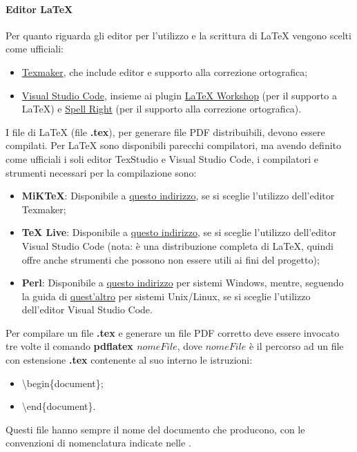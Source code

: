 \paragraph*{Editor \LaTeX}
Per quanto riguarda gli editor per l'utilizzo e la scrittura di \LaTeX{} vengono scelti come ufficiali:
\begin{itemize}
	\item \href{https://www.xm1math.net/texmaker/}{Texmaker}, che include editor e supporto alla correzione ortografica;
	\item \href{https://code.visualstudio.com/}{Visual Studio Code}, insieme ai plugin \href{https://github.com/James-Yu/LaTeX-Workshop}{LaTeX Workshop} (per il supporto a \LaTeX) e \href{https://github.com/bartosz-antosik/vscode-spellright}{Spell Right} (per il supporto alla correzione ortografica).
\end{itemize}
I file di \LaTeX{} (file \textbf{.tex}), per generare file PDF distribuibili, devono essere compilati.
Per \LaTeX{} sono disponibili parecchi compilatori, ma avendo definito come ufficiali i soli editor TexStudio e Visual Studio Code,
i compilatori e strumenti necessari per la compilazione sono:
\begin{itemize}
    \item \textbf{MiKTeX}: Disponibile a \href{https://miktex.org/}{questo indirizzo}, se si sceglie l'utilizzo dell'editor Texmaker;
    \item \textbf{TeX Live}: Disponibile a \href{https://www.tug.org/texlive/}{questo indirizzo}, se si sceglie l'utilizzo dell'editor Visual Studio Code (nota: è una distribuzione completa di \LaTeX, quindi offre anche strumenti che possono non essere utili ai fini del progetto);
    \item \textbf{Perl}: Disponibile a \href{http://strawberryperl.com/}{questo indirizzo} per sistemi Windows, mentre, seguendo la guida di \href{https://learn.perl.org/installing/unix_linux.html}{quest'altro} per sistemi Unix/Linux, se si sceglie l'utilizzo dell'editor Visual Studio Code.
\end{itemize}
Per compilare un file \textbf{.tex} e generare un file PDF corretto deve essere invocato tre volte il comando \textbf{pdflatex $nomeFile$}, dove $nomeFile$ è il percorso ad un file con estensione \textbf{.tex} contenente al suo interno le istruzioni:
\begin{itemize}
    \item \textbackslash begin\{document\};
    \item \textbackslash end\{document\}.
\end{itemize}
Questi file hanno sempre il nome del documento che producono, con le convenzioni di nomenclatura indicate nelle \NdP{}.

